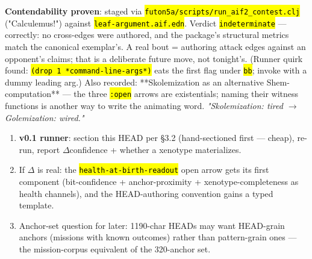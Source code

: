 \documentclass[11pt,oneside]{article}
\newcommand{\scopehl}[1]{\texttt{\hl{#1}}}
\begin{document}
\begin{phasebox}[title={3. DERIVE --- opened with a candidate runner (2026-06-10)}]
\begin{subbox}[title={3.3.2 The lifeform package: \scopehl{E-mission-head.aif.edn} (2026-06-10)}]
\textbf{Contendability proven}: staged via \scopehl{futon5a/scripts/run\_aif2\_contest.clj}
("Calculemus!") against \scopehl{leaf-argument.aif.edn}. Verdict \scopehl{indeterminate} ---
correctly: no cross-edges were authored, and the package's structural metrics
match the canonical exemplar's. A real bout = authoring attack edges against
an opponent's claims; that is a deliberate future move, not tonight's.
(Runner quirk found: \scopehl{(drop 1 *command-line-args*)} eats the first flag under
\scopehl{bb}; invoke with a dummy leading arg.) Also recorded: **Skolemization as an
alternative Shem-computation** --- the three \scopehl{:open} arrows are existentials;
naming their witness functions is another way to write the animating word.
\emph{"Skolemization: tired $\rightarrow$ Golemization: wired."}

\end{subbox}
\begin{subbox}[title={3.4 DERIVE next cars (superseded in part by \S{}4 amendments)}]

\begin{enumerate}[leftmargin=1.4em,itemsep=1pt]
\item \textbf{v0.1 runner}: section this HEAD per \S{}3.2 (hand-sectioned first --- cheap), re-run, report $\Delta$confidence + whether a xenotype materializes.
\item If $\Delta$ is real: the \scopehl{health-at-birth-readout} open arrow gets its first component (bit-confidence + anchor-proximity + xenotype-completeness as health channels), and the HEAD-authoring convention gains a typed template.
\item Anchor-set question for later: 1190-char HEADs may want HEAD-grain anchors (missions with known outcomes) rather than pattern-grain ones --- the mission-corpus equivalent of the 320-anchor set.
\end{enumerate}

\end{subbox}
\end{phasebox}
\end{document}
